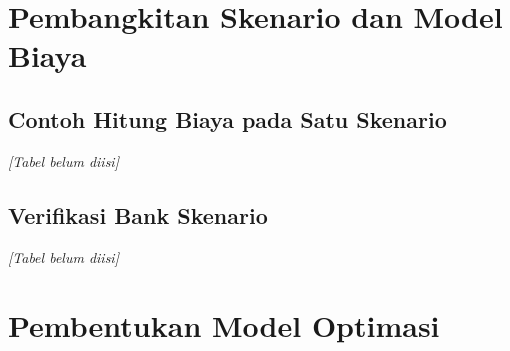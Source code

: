     \section{Pembangkitan Skenario dan Model Biaya}\label{sec:scenarios}

        \subsection{Contoh Hitung Biaya pada Satu Skenario}\label{subsec:scenario example}

        \begin{table}[H]
            \centering
            \caption{Contoh perhitungan faktor kurs dan biaya instrumen pada skenario 1 (bank latih)}\label{tab:scenario example}
            \textit{[Tabel belum diisi]}
        \end{table}

        \subsection{Verifikasi Bank Skenario}\label{subsec:scenario verification}

        \begin{table}[H]
            \centering
            \caption{Verifikasi skenario simulasi terhadap parameter target dan biaya instrumen per skenario}\label{tab:scenario verification}
            \textit{[Tabel belum diisi]}
        \end{table}

    \section{Pembentukan Model Optimasi}\label{sec:model formulation}

